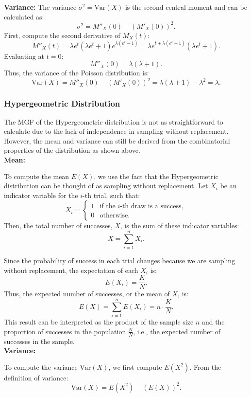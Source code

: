 \textbf{Variance:} The variance \( \sigma^2 = \text{Var}(X) \) is the second central moment and can be calculated as:
\[
\sigma^2 = M''_X(0) - (M'_X(0))^2.
\]
First, compute the second derivative of \( M_X(t) \):
\[
M''_X(t) = \lambda e^t \left( \lambda e^t + 1 \right) e^{\lambda(e^t - 1)} = \lambda e^{t + \lambda(e^t - 1)} \left( \lambda e^t + 1 \right).
\]
Evaluating at \( t = 0 \):
\[
M''_X(0) = \lambda \left( \lambda + 1 \right).
\]
Thus, the variance of the Poisson distribution is:
\[
\text{Var}(X) = M''_X(0) - (M'_X(0))^2 = \lambda (\lambda + 1) - \lambda^2 = \lambda.
\]

\subsubsection{Hypergeometric Distribution}

The MGF of the Hypergeometric distribution is not as straightforward to calculate due to the lack of independence in sampling without replacement. However, the mean and variance can still be derived from the combinatorial properties of the distribution as shown above.\\

\textbf{Mean:}

To compute the mean \( E(X) \), we use the fact that the Hypergeometric distribution can be thought of as sampling without replacement. Let \( X_i \) be an indicator variable for the \( i \)-th trial, such that:
\[
X_i = 
\begin{cases} 
1 & \text{if the } i \text{-th draw is a success}, \\ 
0 & \text{otherwise}.
\end{cases}
\]
Then, the total number of successes, \( X \), is the sum of these indicator variables:
\[
X = \sum_{i=1}^{n} X_i.
\]

Since the probability of success in each trial changes because we are sampling without replacement, the expectation of each \( X_i \) is:
\[
E(X_i) = \frac{K}{N}.
\]
Thus, the expected number of successes, or the mean of \( X \), is:
\[
E(X) = \sum_{i=1}^{n} E(X_i) = n \cdot \frac{K}{N}.
\]
This result can be interpreted as the product of the sample size \( n \) and the proportion of successes in the population \( \frac{K}{N} \), i.e., the expected number of successes in the sample.\\

\textbf{Variance:}

To compute the variance \( \text{Var}(X) \), we first compute \( E(X^2) \). From the definition of variance:
\[
\text{Var}(X) = E(X^2) - (E(X))^2.
\]

